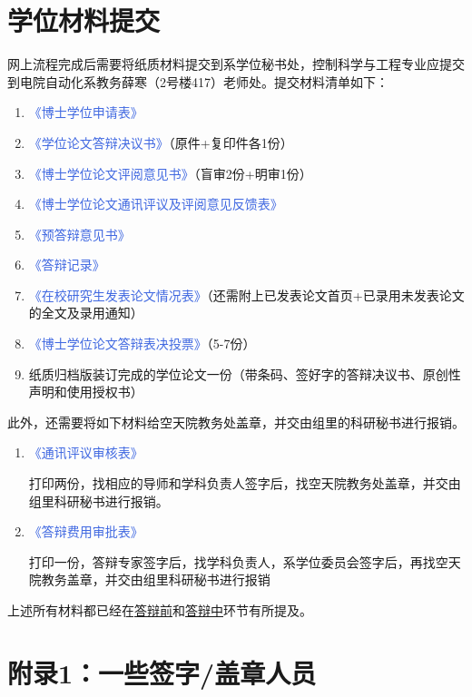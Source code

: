 \documentclass[a4paper, 12pt]{ctexart}
\newcommand{\form}[1]{\textcolor{RoyalBlue}{《#1》}}
\begin{document}
\section{学位材料提交}
网上流程完成后需要将纸质材料提交到系学位秘书处，控制科学与工程专业应提交到电院自动化系教务薛寒（2号楼417）老师处。提交材料清单如下：
\begin{enumerate}
    \item \form{博士学位申请表}
    \item \form{学位论文答辩决议书}（原件+复印件各1份）
    \item \form{博士学位论文评阅意见书}（盲审2份+明审1份）
    \item \form{博士学位论文通讯评议及评阅意见反馈表}
    \item \form{预答辩意见书}
    \item \form{答辩记录}
    \item \form{在校研究生发表论文情况表}（还需附上已发表论文首页+已录用未发表论文的全文及录用通知）
    \item \form{博士学位论文答辩表决投票}（5-7份）
    \item 纸质归档版装订完成的学位论文一份（带条码、签好字的答辩决议书、原创性声明和使用授权书）
\end{enumerate}

此外，还需要将如下材料给空天院教务处盖章，并交由组里的科研秘书进行报销。
\begin{enumerate}
\item \form{通讯评议审核表}

打印两份，找相应的导师和学科负责人签字后，找空天院教务处盖章，并交由组里科研秘书进行报销。

\item \form{答辩费用审批表}

打印一份，答辩专家签字后，找学科负责人，系学位委员会签字后，再找空天院教务盖章，并交由组里科研秘书进行报销
\end{enumerate}

上述所有材料都已经在\hyperlink{dbq}{答辩前}和\hyperlink{dbz}{答辩中}环节有所提及。

\section*{\hypertarget{sec:appendix}{附录1}：一些签字/盖章人员}
\end{document}
